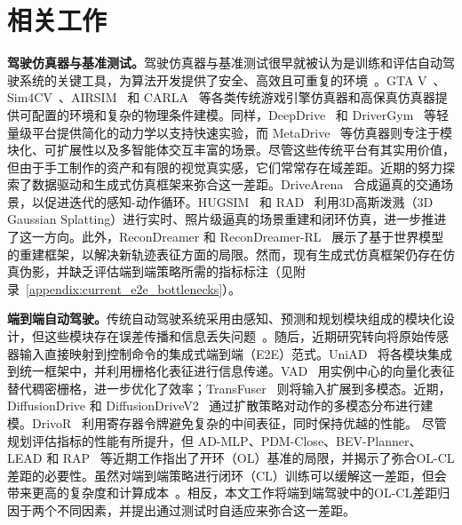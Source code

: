 \documentclass{article}
\begin{document}
\section{相关工作}
\textbf{驾驶仿真器与基准测试。}驾驶仿真器与基准测试很早就被认为是训练和评估自动驾驶系统的关键工具，为算法开发提供了安全、高效且可重复的环境~\cite{alghodhaifi2021autonomous, rosique2019systematic, ye2019automated, osinski2020simulation, wu2024recent}。GTA V~\cite{gtav}、Sim4CV~\cite{muller2018sim4cv}、AIRSIM~\cite{shah2018airsim} 和 CARLA~\cite{dosovitskiy2017carla} 等各类传统游戏引擎仿真器和高保真仿真器提供可配置的环境和复杂的物理条件建模。同样，DeepDrive~\cite{deepdrive} 和 DriverGym~\cite{kothari2021drivergym} 等轻量级平台提供简化的动力学以支持快速实验，而 MetaDrive~\cite{li2022metadrive} 等仿真器则专注于模块化、可扩展性以及多智能体交互丰富的场景。尽管这些传统平台有其实用价值，但由于手工制作的资产和有限的视觉真实感，它们常常存在域差距。近期的努力探索了数据驱动和生成式仿真框架来弥合这一差距。DriveArena~\cite{yang2024drivearena} 合成逼真的交通场景，以促进迭代的感知-动作循环。HUGSIM~\cite{zhou2024hugsim} 和 RAD~\cite{gao2025rad} 利用3D高斯泼溅（3D Gaussian Splatting）进行实时、照片级逼真的场景重建和闭环仿真，进一步推进了这一方向。此外，ReconDreamer 和 ReconDreamer-RL~\cite{ni2025recondreamer, ni2025recondreamerrl} 展示了基于世界模型的重建框架，以解决新轨迹表征方面的局限。然而，现有生成式仿真框架仍存在仿真伪影，并缺乏评估端到端策略所需的指标标注（见附录~\ref{appendix:current_e2e_bottlenecks}）。

\textbf{端到端自动驾驶。}传统自动驾驶系统采用由感知、预测和规划模块组成的模块化设计，但这些模块存在误差传播和信息丢失问题~\cite{luo2018fast, liang2020pnpnet, sadat2020perceive, li2024womd}。随后，近期研究转向将原始传感器输入直接映射到控制命令的集成式端到端（E2E）范式。UniAD~\cite{uniad} 将各模块集成到统一框架中，并利用栅格化表征进行信息传递。VAD~\cite{vad} 用实例中心的向量化表征替代稠密栅格，进一步优化了效率；TransFuser~\cite{transfuser} 则将输入扩展到多模态。近期，DiffusionDrive 和 DiffusionDriveV2~\cite{diffusiondrive, diffusiondrivev2} 通过扩散策略对动作的多模态分布进行建模。DrivoR~\cite{DrivoR} 利用寄存器令牌避免复杂的中间表征，同时保持优越的性能。
尽管规划评估指标的性能有所提升，但 AD-MLP、PDM-Close、BEV-Planner、LEAD 和 RAP~\cite{zhai2023rethinking, dauner2023parting, li2024ego, LEAD, RAP} 等近期工作指出了开环（OL）基准的局限，并揭示了弥合OL-CL差距的必要性。虽然对端到端策略进行闭环（CL）训练可以缓解这一差距，但会带来更高的复杂度和计算成本~\cite{KarkusBeyondBC}。相反，本文工作将端到端驾驶中的OL-CL差距归因于两个不同因素，并提出通过测试时自适应来弥合这一差距。
\end{document}
